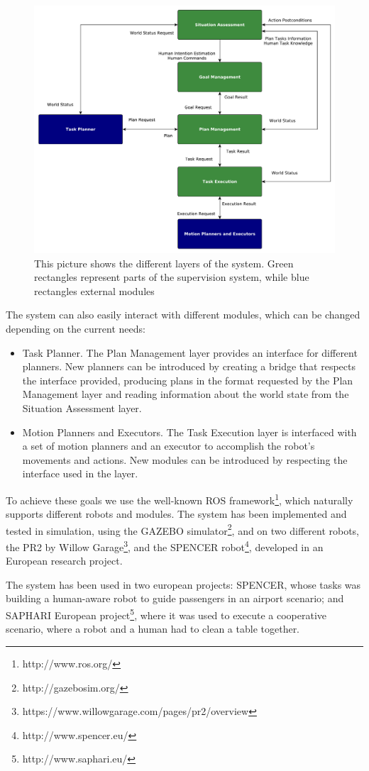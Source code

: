  \begin{figure}[h!]
	\centering
	\includegraphics[scale=0.45]{img/intro/system_architecture.pdf}
	\caption[System architecture]{This picture shows the different layers of the system. Green rectangles represent parts of the
	supervision system, while blue rectangles external modules}
	\label{fig:intro-system_architecture}
\end{figure}

The system can also easily interact with different modules, which can be changed depending on the current needs:
\begin{itemize}
\item Task Planner. The Plan Management layer provides an interface for different planners. New planners can be introduced by creating a bridge that respects the interface provided, producing plans in the format requested by the Plan Management layer and reading information about the world state from the Situation Assessment layer.
\item Motion Planners and Executors. The Task Execution layer is interfaced with a set of motion planners and an executor to accomplish the robot's movements and actions. New modules can be introduced by respecting the interface used in the layer.
\end{itemize}


To achieve these goals we use the well-known ROS framework\footnote{http://www.ros.org/}, which naturally supports different robots and modules. The system has been implemented and tested in simulation, using the GAZEBO simulator\footnote{http://gazebosim.org/}, and on two different robots, the PR2 by Willow Garage\footnote{https://www.willowgarage.com/pages/pr2/overview}, and the SPENCER robot\footnote{http://www.spencer.eu/}, developed in an European research project. 

The system has been used in two european projects: SPENCER, whose tasks was building a human-aware robot to guide passengers in an airport scenario; and SAPHARI European project\footnote{http://www.saphari.eu/}, where it was used to execute a cooperative scenario, where a robot and a human had to clean a table together.